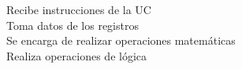 \documentclass[preview]{standalone}
\begin{document}
Recibe instrucciones de la UC\\Toma datos de los registros\\Se encarga de realizar operaciones matemáticas\\Realiza operaciones de lógica\\
\end{document}
